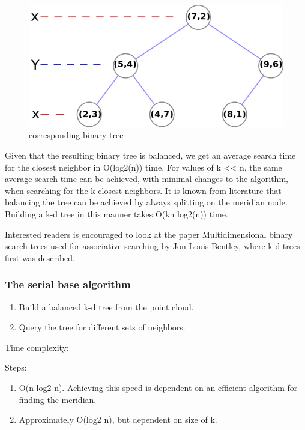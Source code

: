 \begin{figure}[ht!]
\centering
\includegraphics[width=120mm]{../gfx/Tree_0001.png}

\caption{corresponding-binary-tree}
\label{fig:tree_0001}
\end{figure}

Given that the resulting binary tree is balanced, we get an average search time for the closest neighbor in O(log2(n)) time. For values of k << n, the same average search time can be achieved, with minimal changes to the algorithm, when searching for the k closest neighbors. It is known from literature that balancing the tree can be achieved by always splitting on the meridian node. Building a k-d tree in this manner takes O(kn log2(n)) time.

Interested readers is encouraged to look at the paper Multidimensional binary search trees used for associative searching by Jon Louis Bentley, where k-d trees first was described.





\subsubsection{The serial base algorithm} %
\label{ssub:the_serial_base_algorithm}

\begin{enumerate}
    \item Build a balanced k-d tree from the point cloud.
    \item Query the tree for different sets of neighbors.
\end{enumerate}

Time complexity:

Steps:
\begin{enumerate}
    \item O(n log2 n). Achieving this speed is dependent on an efficient algorithm for finding the meridian.
    \item Approximately O(log2 n), but dependent on size of k.
\end{enumerate}

